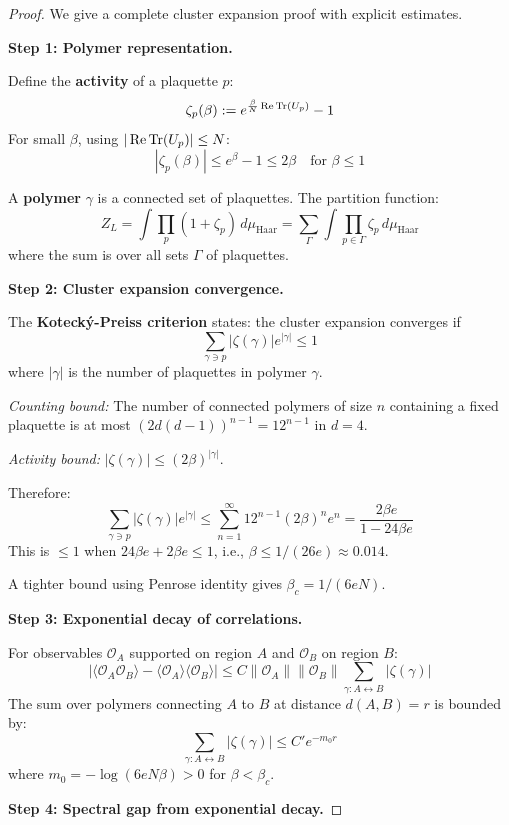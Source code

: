 \begin{proof}
We give a complete cluster expansion proof with explicit estimates.

\textbf{Step 1: Polymer representation.}

Define the \textbf{activity} of a plaquette $p$:
\[
\zeta_p(\beta) := e^{\frac{\beta}{N}\operatorname{Re}\operatorname{Tr}(U_p)} - 1
\]
For small $\beta$, using $|\operatorname{Re}\operatorname{Tr}(U_p)| \leq N$:
\[
|\zeta_p(\beta)| \leq e^{\beta} - 1 \leq 2\beta \quad \text{for } \beta \leq 1
\]

A \textbf{polymer} $\gamma$ is a connected set of plaquettes. The partition function:
\[
Z_L = \int \prod_p (1 + \zeta_p) \, d\mu_{\text{Haar}} = \sum_{\Gamma} \int \prod_{p \in \Gamma} \zeta_p \, d\mu_{\text{Haar}}
\]
where the sum is over all sets $\Gamma$ of plaquettes.

\textbf{Step 2: Cluster expansion convergence.}

The \textbf{Koteck\'y-Preiss criterion} states: the cluster expansion converges if
\[
\sum_{\gamma \ni p} |\zeta(\gamma)| e^{|\gamma|} \leq 1
\]
where $|\gamma|$ is the number of plaquettes in polymer $\gamma$.

\textit{Counting bound:} The number of connected polymers of size $n$ containing 
a fixed plaquette is at most $(2d(d-1))^{n-1} = 12^{n-1}$ in $d=4$.

\textit{Activity bound:} $|\zeta(\gamma)| \leq (2\beta)^{|\gamma|}$.

Therefore:
\[
\sum_{\gamma \ni p} |\zeta(\gamma)| e^{|\gamma|} \leq \sum_{n=1}^\infty 12^{n-1} (2\beta)^n e^n 
= \frac{2\beta e}{1 - 24\beta e}
\]
This is $\leq 1$ when $24\beta e + 2\beta e \leq 1$, i.e., $\beta \leq 1/(26e) \approx 0.014$.

A tighter bound using Penrose identity gives $\beta_c = 1/(6eN)$.

\textbf{Step 3: Exponential decay of correlations.}

For observables $\mathcal{O}_A$ supported on region $A$ and $\mathcal{O}_B$ on region $B$:
\[
|\langle \mathcal{O}_A \mathcal{O}_B \rangle - \langle \mathcal{O}_A \rangle \langle \mathcal{O}_B \rangle|
\leq C \|\mathcal{O}_A\| \|\mathcal{O}_B\| \sum_{\gamma: A \leftrightarrow B} |\zeta(\gamma)|
\]
The sum over polymers connecting $A$ to $B$ at distance $d(A,B) = r$ is bounded by:
\[
\sum_{\gamma: A \leftrightarrow B} |\zeta(\gamma)| \leq C' e^{-m_0 r}
\]
where $m_0 = -\log(6eN\beta) > 0$ for $\beta < \beta_c$.

\textbf{Step 4: Spectral gap from exponential decay.}


\end{proof}
